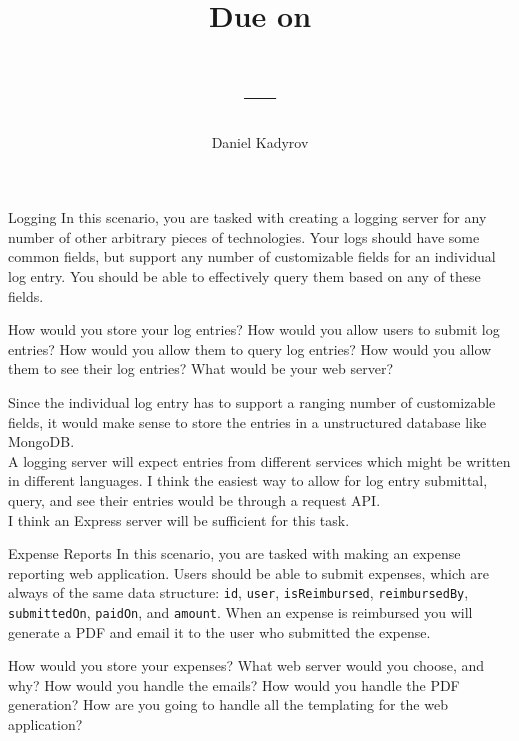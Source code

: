 \documentclass{homework}
\title{
    \Title \\
    \vspace{2mm}
    \large
    Due on \DueDate \\
    \ClassName \\ 
    \ClassNumber ---\ClassSection \\
    \Instructor
}
\author{Daniel Kadyrov}
\date{}
\begin{document}
\maketitle
\thispagestyle{empty}

\begin{problem}[1]{Logging}
    In this scenario, you are tasked with creating a logging server for any number of other arbitrary pieces of technologies. Your logs should have some common fields, but support any number of customizable fields for an individual log entry. You should be able to effectively query them based on any of these fields.

    \vskip 1mm

    How would you store your log entries? How would you allow users to submit log entries? How would you allow them to query log entries? How would you allow them to see their log entries? What would be your web server?
\end{problem}

\begin{solution}
    Since the individual log entry has to support a ranging number of customizable fields, it would make sense to store the entries in a unstructured database like MongoDB. \\

    A logging server will expect entries from different services which might be written in different languages. I think the easiest way to allow for log entry submittal, query, and see their entries would be through a request API. \\
    
    I think an Express server will be sufficient for this task.
\end{solution}

\begin{problem}[2]{Expense Reports}
    In this scenario, you are tasked with making an expense reporting web application. Users should be able to submit expenses, which are always of the same data structure: \texttt{id}, \texttt{user}, \texttt{isReimbursed}, \texttt{reimbursedBy}, \texttt{submittedOn}, \texttt{paidOn}, and \texttt{amount}. When an expense is reimbursed you will generate a PDF and email it to the user who submitted the expense. 
    
    \vskip 1mm

    How would you store your expenses? What web server would you choose, and why? How would you handle the emails? How would you handle the PDF generation? How are you going to handle all the templating for the web application?
\end{problem}
\end{document}
